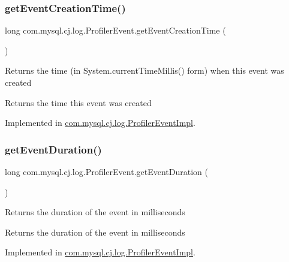 \subsubsection{\texorpdfstring{get\+Event\+Creation\+Time()}{getEventCreationTime()}}
{\footnotesize\ttfamily long com.\+mysql.\+cj.\+log.\+Profiler\+Event.\+get\+Event\+Creation\+Time (\begin{DoxyParamCaption}{ }\end{DoxyParamCaption})}

Returns the time (in System.\+current\+Time\+Millis() form) when this event was created

\begin{DoxyReturn}{Returns}
the time this event was created 
\end{DoxyReturn}


Implemented in \mbox{\hyperlink{classcom_1_1mysql_1_1cj_1_1log_1_1_profiler_event_impl_a813e48b37bcb0b9c5169a262801f4d00}{com.\+mysql.\+cj.\+log.\+Profiler\+Event\+Impl}}.

\mbox{\label{interfacecom_1_1mysql_1_1cj_1_1log_1_1_profiler_event_a82728ebce7920e4a0096f8135ec8336b}} 
\subsubsection{\texorpdfstring{get\+Event\+Duration()}{getEventDuration()}}
{\footnotesize\ttfamily long com.\+mysql.\+cj.\+log.\+Profiler\+Event.\+get\+Event\+Duration (\begin{DoxyParamCaption}{ }\end{DoxyParamCaption})}

Returns the duration of the event in milliseconds

\begin{DoxyReturn}{Returns}
the duration of the event in milliseconds 
\end{DoxyReturn}


Implemented in \mbox{\hyperlink{classcom_1_1mysql_1_1cj_1_1log_1_1_profiler_event_impl_a52efd224f93dd9a3238995df02e4f330}{com.\+mysql.\+cj.\+log.\+Profiler\+Event\+Impl}}.

\mbox{\label{interfacecom_1_1mysql_1_1cj_1_1log_1_1_profiler_event_a5bc617e47a2d49ad356c17bd45f5be0d}} 
